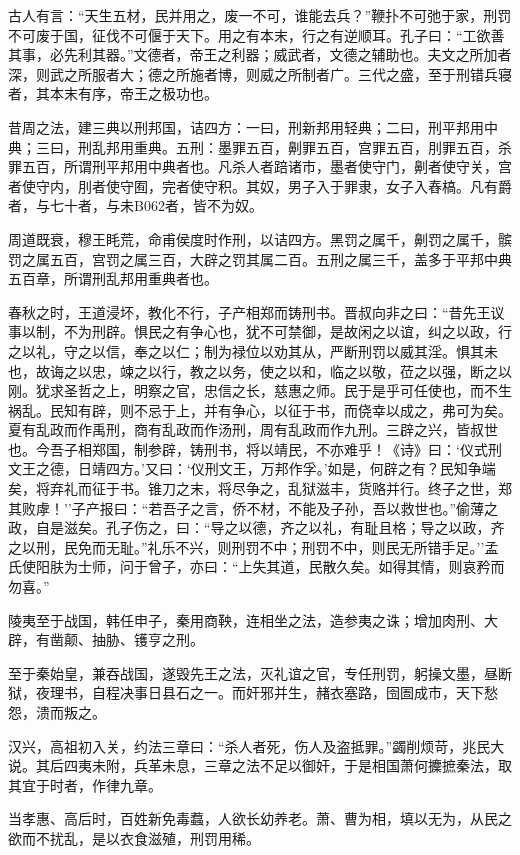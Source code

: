 \documentclass[]{article}
\begin{document}
古人有言：``天生五材，民并用之，废一不可，谁能去兵？''鞭扑不可弛于家，刑罚不可废于国，征伐不可偃于天下。用之有本末，行之有逆顺耳。孔子曰：``工欲善其事，必先利其器。''文德者，帝王之利器；威武者，文德之辅助也。夫文之所加者深，则武之所服者大；德之所施者博，则威之所制者广。三代之盛，至于刑错兵寝者，其本末有序，帝王之极功也。

昔周之法，建三典以刑邦国，诘四方：一曰，刑新邦用轻典；二曰，刑平邦用中典；三曰，刑乱邦用重典。五刑：墨罪五百，劓罪五百，宫罪五百，刖罪五百，杀罪五百，所谓刑平邦用中典者也。凡杀人者踣诸市，墨者使守门，劓者使守关，宫者使守内，刖者使守囿，完者使守积。其奴，男子入于罪隶，女子入舂槁。凡有爵者，与七十者，与未B062者，皆不为奴。

周道既衰，穆王眊荒，命甫侯度时作刑，以诘四方。黑罚之属千，劓罚之属千，髌罚之属五百，宫罚之属三百，大辟之罚其属二百。五刑之属三千，盖多于平邦中典五百章，所谓刑乱邦用重典者也。

春秋之时，王道浸坏，教化不行，子产相郑而铸刑书。晋叔向非之曰：``昔先王议事以制，不为刑辟。惧民之有争心也，犹不可禁御，是故闲之以谊，纠之以政，行之以礼，守之以信，奉之以仁；制为禄位以劝其从，严断刑罚以威其淫。惧其未也，故诲之以忠，竦之以行，教之以务，使之以和，临之以敬，莅之以强，断之以刚。犹求圣哲之上，明察之官，忠信之长，慈惠之师。民于是乎可任使也，而不生祸乱。民知有辟，则不忌于上，并有争心，以征于书，而侥幸以成之，弗可为矣。夏有乱政而作禹刑，商有乱政而作汤刑，周有乱政而作九刑。三辟之兴，皆叔世也。今吾子相郑国，制参辟，铸刑书，将以靖民，不亦难乎！《诗》曰：`仪式刑文王之德，日靖四方。'又曰：`仪刑文王，万邦作孚。'如是，何辟之有？民知争端矣，将弃礼而征于书。锥刀之末，将尽争之，乱狱滋丰，货赂并行。终子之世，郑其败虖！''子产报曰：``若吾子之言，侨不材，不能及子孙，吾以救世也。''偷薄之政，自是滋矣。孔子伤之，曰：``导之以德，齐之以礼，有耻且格；导之以政，齐之以刑，民免而无耻。''礼乐不兴，则刑罚不中；刑罚不中，则民无所错手足。''孟氏使阳肤为士师，问于曾子，亦曰：``上失其道，民散久矣。如得其情，则哀矜而勿喜。''

陵夷至于战国，韩任申子，秦用商鞅，连相坐之法，造参夷之诛；增加肉刑、大辟，有凿颠、抽胁、镬亨之刑。

至于秦始皇，兼吞战国，遂毁先王之法，灭礼谊之官，专任刑罚，躬操文墨，昼断狱，夜理书，自程决事日县石之一。而奸邪并生，赭衣塞路，囹圄成市，天下愁怨，溃而叛之。

汉兴，高祖初入关，约法三章曰：``杀人者死，伤人及盗抵罪。''蠲削烦苛，兆民大说。其后四夷未附，兵革未息，三章之法不足以御奸，于是相国萧何攈摭秦法，取其宜于时者，作律九章。

当孝惠、高后时，百姓新免毒蠚，人欲长幼养老。萧、曹为相，填以无为，从民之欲而不扰乱，是以衣食滋殖，刑罚用稀。
\end{document}
